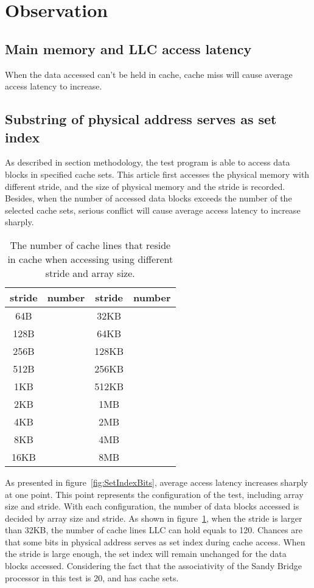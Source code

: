 \documentclass[conference]{IEEEtran}
\newcommand{\SandyBridge}{Sandy Bridge }
\newcommand{\otoprule}{\midrule[\heavyrulewidth]}
\begin{document}
\section{Observation}
\subsection{Main memory and LLC access latency}
When the data accessed can't be held in cache, cache miss will cause average access latency to increase. 
\subsection{Substring of physical address serves as set index}
As described in section methodology, the test program is able to access data blocks in specified cache sets. This article first accesses the physical memory with different stride, and the size of physical memory and the stride is recorded. Besides, when the number of accessed data blocks exceeds the number of the selected cache sets, serious conflict will cause average access latency to increase sharply.
\begin{table}[!htbp]
	\centering
	\caption{The number of cache lines that reside in cache when accessing using different stride and array size.}
	\begin{tabular}{cccc}
		\toprule
		stride  &number    & stride & number \\ \otoprule
		64B      &   &   32KB      &        \\ \midrule
		128B     &   &   64KB      &        \\ \midrule
		256B     &   &  128KB      &        \\ \midrule
		512B     &   &  256KB      &        \\ \midrule
		 1KB     &   &  512KB      &        \\ \midrule
		 2KB     &    &    1MB      &        \\ \midrule
		 4KB     &    &    2MB      &        \\ \midrule
		 8KB     &    &    4MB      &        \\ \midrule
		16KB     &    &    8MB      &        \\ \bottomrule
		\end{tabular}
		\label{tab:SetIndexBitsSingularity}
\end{table}

As presented in figure~\ref{fig:SetIndexBits}, average access latency increases sharply at one point. This point represents the configuration of the test, including array size and stride. With each configuration, the number of data blocks accessed is decided by array size and stride. As shown in figure~\ref{tab:SetIndexBitsSingularity}, when the stride is larger than 32KB, the number of cache lines LLC can hold equals to 120. Chances are that some bits in physical address serves as set index during cache access. When the stride is large enough, the set index will remain unchanged for the data blocks accessed. Considering the fact that the associativity of the \SandyBridge processor in this test is 20, and has  cache sets. 
\end{document}
